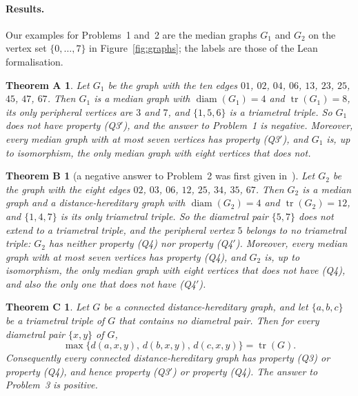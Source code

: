 \documentclass[11pt]{article}
\newtheorem*{thmA}{Theorem A}
\newtheorem*{thmB}{Theorem B}
\newtheorem*{thmC}{Theorem C}
\theoremstyle{remark}
\DeclareMathOperator{\diam}{diam}
\DeclareMathOperator{\tr}{tr}
\newcommand{\QA}{\textup{(Q3)}}
\newcommand{\QAp}{\textup{(Q3$'$)}}
\newcommand{\QB}{\textup{(Q4)}}
\newcommand{\QBp}{\textup{(Q4$'$)}}
\begin{document}
\paragraph{Results.}
Our examples for Problems~1 and~2 are the median graphs $G_1$ and $G_2$ on the vertex set $\{0,\dots,7\}$ in
Figure~\ref{fig:graphs}; the labels are those of the Lean formalisation.

\begin{thmA}
Let $G_1$ be the graph with the ten edges $01$, $02$, $04$, $06$, $13$, $23$,
$25$, $45$, $47$, $67$. Then $G_1$ is a median graph with $\diam(G_1)=4$ and
$\tr(G_1)=8$, its only peripheral vertices are $3$ and $7$, and $\{1,5,6\}$ is
a triametral triple. So $G_1$ does not have property \QAp, and the answer to
Problem~1 is negative. Moreover, every median graph with at most seven vertices
has property \QAp, and $G_1$ is, up to isomorphism, the only median graph with
eight vertices that does not.
\end{thmA}

\begin{thmB}[{a negative answer to Problem~2 was first given in~\cite{mo-a}}]
Let $G_2$ be the graph with the eight edges $02$, $03$, $06$, $12$, $25$, $34$,
$35$, $67$. Then $G_2$ is a median graph and a distance-hereditary graph with
$\diam(G_2)=4$ and $\tr(G_2)=12$, and $\{1,4,7\}$ is its only triametral triple.
So the diametral pair $\{5,7\}$ does not extend to a triametral triple, and the
peripheral vertex $5$ belongs to no triametral triple: $G_2$ has neither
property \QB{} nor property \QBp. Moreover, every median graph with at most
seven vertices has property \QB, and $G_2$ is, up to isomorphism, the only
median graph with eight vertices that does not have \QB, and also the only one
that does not have \QBp.
\end{thmB}

\begin{thmC}
Let $G$ be a connected distance-hereditary graph, and let $\{a,b,c\}$ be a
triametral triple of $G$ that contains no diametral pair. Then for every
diametral pair $\{x,y\}$ of $G$,
\[
 \max\{d(a,x,y),\,d(b,x,y),\,d(c,x,y)\}=\tr(G).
\]
Consequently every connected distance-hereditary graph has property \QA{} or
property \QB, and hence property \QAp{} or property \QB. The answer to
Problem~3 is positive.
\end{thmC}
\end{document}
